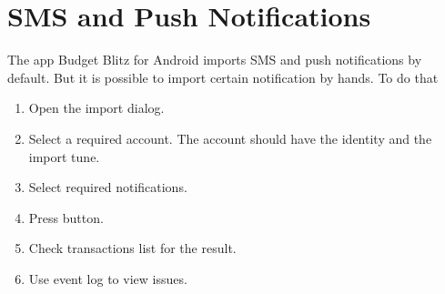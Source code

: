 \documentclass[a4paper,10pt,english]{sphinxmanual}
\begin{document}
\section{SMS and Push Notifications}
\label{\detokenize{import:sms-and-push-notifications}}
\sphinxAtStartPar
The app Budget Blitz for Android imports SMS and push notifications by default. But it is possible to import
certain notification by hands. To do that
\begin{enumerate}
%
\item {} 
\sphinxAtStartPar
Open the import dialog.

\item {} 
\sphinxAtStartPar
Select a required account. The account should have the identity and the import tune.

\item {} 
\sphinxAtStartPar
Select required notifications.

\item {} 
\sphinxAtStartPar
Press  button.

\item {} 
\sphinxAtStartPar
Check transactions list for the result.

\item {} 
\sphinxAtStartPar
Use event log to view issues.

\end{enumerate}

\noindent{}

\noindent{}

\noindent{}

\noindent{}

\noindent{}

\noindent{}

\noindent{}

\noindent{}
\end{document}
